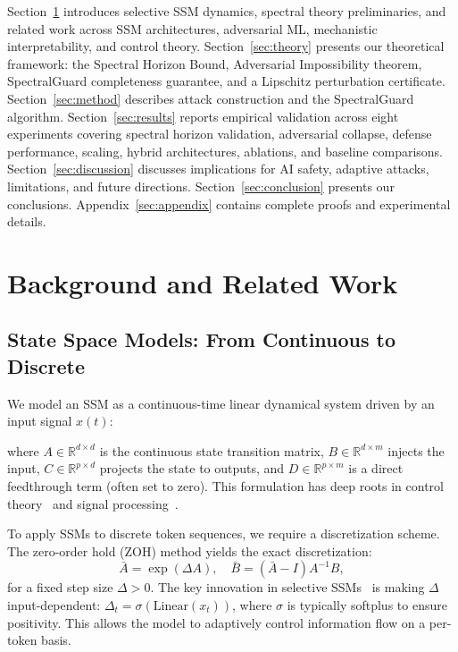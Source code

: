 \documentclass[10pt,twocolumn]{article}
\begin{document}
Section~\ref{sec:background} introduces selective SSM dynamics, spectral theory preliminaries, and related work across SSM architectures, adversarial ML, mechanistic interpretability, and control theory. Section~\ref{sec:theory} presents our theoretical framework: the Spectral Horizon Bound, Adversarial Impossibility theorem, SpectralGuard completeness guarantee, and a Lipschitz perturbation certificate. Section~\ref{sec:method} describes attack construction and the SpectralGuard algorithm. Section~\ref{sec:results} reports empirical validation across eight experiments covering spectral horizon validation, adversarial collapse, defense performance, scaling, hybrid architectures, ablations, and baseline comparisons. Section~\ref{sec:discussion} discusses implications for AI safety, adaptive attacks, limitations, and future directions. Section~\ref{sec:conclusion} presents our conclusions. Appendix~\ref{sec:appendix} contains complete proofs and experimental details.

\section{Background and Related Work}
\label{sec:background}

\subsection{State Space Models: From Continuous to Discrete}

We model an SSM as a continuous-time linear dynamical system driven by an input signal $x(t)$:

where $A\in\mathbb{R}^{d\times d}$ is the continuous state transition matrix, $B\in\mathbb{R}^{d\times m}$ injects the input, $C\in\mathbb{R}^{p\times d}$ projects the state to outputs, and $D\in\mathbb{R}^{p\times m}$ is a direct feedthrough term (often set to zero). This formulation has deep roots in control theory~\cite{kalman1960contributions} and signal processing~\cite{oppenheim1999discrete}.

To apply SSMs to discrete token sequences, we require a discretization scheme. The zero-order hold (ZOH) method yields the exact discretization:
\begin{equation}
    \bar{A} = \exp(\Delta A), \quad \bar{B} = (\bar{A} - I) A^{-1} B,
    \label{eq:discretization_exact}
\end{equation}
for a fixed step size $\Delta>0$. The key innovation in selective SSMs~\cite{gu2023mamba} is making $\Delta$ input-dependent: $\Delta_t = \sigma(\text{Linear}(x_t))$, where $\sigma$ is typically softplus to ensure positivity. This allows the model to adaptively control information flow on a per-token basis.
\end{document}
